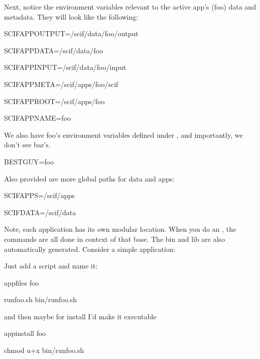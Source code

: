 \documentclass[letterpaper,10pt,english]{sphinxmanual}
\begin{document}
Next, notice the environment variables relevant to the active
app’s (foo) data and metadata. They will look like the following:

%
\begin{sphinxVerbatim}[commandchars=\\\{\}]
SCIF\PYGZus{}APPOUTPUT=/scif/data/foo/output

SCIF\PYGZus{}APPDATA=/scif/data/foo

SCIF\PYGZus{}APPINPUT=/scif/data/foo/input

SCIF\PYGZus{}APPMETA=/scif/apps/foo/scif

SCIF\PYGZus{}APPROOT=/scif/apps/foo

SCIF\PYGZus{}APPNAME=foo
\end{sphinxVerbatim}

We also have foo’s environment variables defined under  , and
importantly, we don’t see bar’s.

%
\begin{sphinxVerbatim}[commandchars=\\\{\}]
BEST\PYGZus{}GUY=foo
\end{sphinxVerbatim}

Also provided are more global paths for data and apps:

%
\begin{sphinxVerbatim}[commandchars=\\\{\}]
SCIF\PYGZus{}APPS=/scif/apps

SCIF\PYGZus{}DATA=/scif/data
\end{sphinxVerbatim}

Note, each application has its own modular location. When you do an ,
the commands are all done in context of that base. The bin and lib are
also automatically generated. Consider a simple application:

Just add a script and name it:

%
\begin{sphinxVerbatim}[commandchars=\\\{\}]
\PYGZpc{}appfiles foo

    runfoo.sh   bin/runfoo.sh
\end{sphinxVerbatim}

and then maybe for install I’d make it executable

%
\begin{sphinxVerbatim}[commandchars=\\\{\}]
\PYGZpc{}appinstall foo

    chmod u+x bin/runfoo.sh
\end{sphinxVerbatim}
\end{document}
